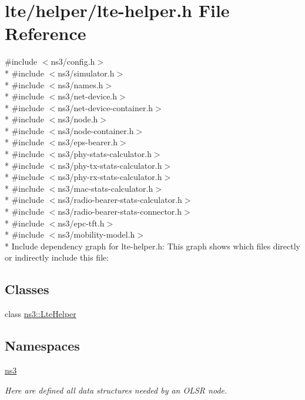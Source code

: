\hypertarget{lte-helper_8h}{}\section{lte/helper/lte-\/helper.h File Reference}
\label{lte-helper_8h}
{\ttfamily \#include $<$ns3/config.\+h$>$}\\*
{\ttfamily \#include $<$ns3/simulator.\+h$>$}\\*
{\ttfamily \#include $<$ns3/names.\+h$>$}\\*
{\ttfamily \#include $<$ns3/net-\/device.\+h$>$}\\*
{\ttfamily \#include $<$ns3/net-\/device-\/container.\+h$>$}\\*
{\ttfamily \#include $<$ns3/node.\+h$>$}\\*
{\ttfamily \#include $<$ns3/node-\/container.\+h$>$}\\*
{\ttfamily \#include $<$ns3/eps-\/bearer.\+h$>$}\\*
{\ttfamily \#include $<$ns3/phy-\/stats-\/calculator.\+h$>$}\\*
{\ttfamily \#include $<$ns3/phy-\/tx-\/stats-\/calculator.\+h$>$}\\*
{\ttfamily \#include $<$ns3/phy-\/rx-\/stats-\/calculator.\+h$>$}\\*
{\ttfamily \#include $<$ns3/mac-\/stats-\/calculator.\+h$>$}\\*
{\ttfamily \#include $<$ns3/radio-\/bearer-\/stats-\/calculator.\+h$>$}\\*
{\ttfamily \#include $<$ns3/radio-\/bearer-\/stats-\/connector.\+h$>$}\\*
{\ttfamily \#include $<$ns3/epc-\/tft.\+h$>$}\\*
{\ttfamily \#include $<$ns3/mobility-\/model.\+h$>$}\\*
Include dependency graph for lte-\/helper.h\+:
This graph shows which files directly or indirectly include this file\+:
\subsection*{Classes}
\begin{DoxyCompactItemize}
\item 
class \hyperlink{classns3_1_1LteHelper}{ns3\+::\+Lte\+Helper}
\end{DoxyCompactItemize}
\subsection*{Namespaces}
\begin{DoxyCompactItemize}
\item 
 \hyperlink{namespacens3}{ns3}
\begin{DoxyCompactList}\small\item\em Here are defined all data structures needed by an O\+L\+SR node. \end{DoxyCompactList}\end{DoxyCompactItemize}
